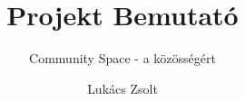 \documentclass[aspectratio=43,11pt]{beamer}
\title{Projekt Bemutató}
\subtitle{Community Space - a közösségért}
\author{Lukács Zsolt}
\begin{document}
\frame{\titlepage}
\end{document}
